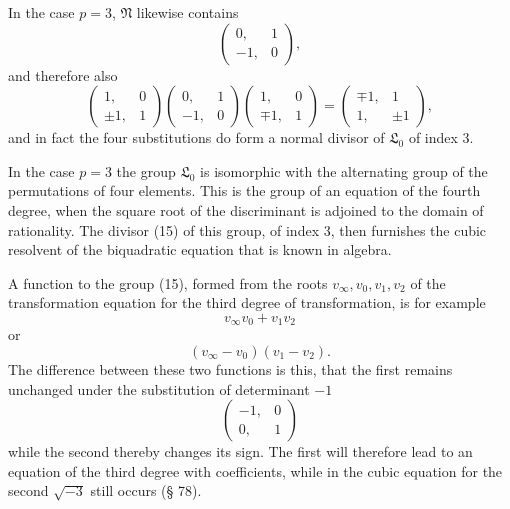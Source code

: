 In the case $p = 3$, $\mathfrak{N}$ likewise contains
\[
\begin{pmatrix} 0, & 1 \\ -1, & 0 \end{pmatrix},
\]
and therefore also
\[
\begin{pmatrix} 1, & 0 \\ \pm1, & 1 \end{pmatrix}\begin{pmatrix} 0, & 1 \\ -1, & 0 \end{pmatrix}\begin{pmatrix} 1, & 0 \\ \mp1, & 1 \end{pmatrix} = \begin{pmatrix} \mp1, & 1 \\ 1, & \pm1 \end{pmatrix},
\]
and in fact the four substitutions
do form a normal divisor of $\mathfrak{L}_0$ of index 3.

In the case $p = 3$ the group $\mathfrak{L}_0$ is isomorphic with the alternating group of the permutations of four elements. This is the group of an  equation of the fourth degree, when the square root of the discriminant is adjoined to the domain of rationality. The divisor (15) of this group, of index 3, then furnishes the cubic resolvent of the biquadratic equation that is known in algebra.

A function  to the group (15), formed from the roots $v_\infty, v_0, v_1, v_2$ of the transformation equation for the third degree of transformation, is for example
\[
v_\infty v_0 + v_1 v_2
\]
or
\[
(v_\infty - v_0)(v_1 - v_2).
\]
The difference between these two functions is this, that the first remains unchanged under the substitution of determinant $-1$
\[
\begin{pmatrix} -1, & 0 \\ 0, & 1 \end{pmatrix}
\]
while the second thereby changes its sign. The first will therefore lead to an equation of the third degree with  coefficients, while in the cubic equation for the second $\sqrt{-3}$ still occurs (§ 78).
